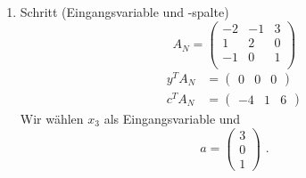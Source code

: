 \documentclass[a4paper]{scrartcl}
\begin{document}
\begin{enumerate}[label=\bfseries\arabic*.]
\begin{enumerate}
\begin{enumerate}[1.]
\begin{enumerate}[1.]
                            \item Schritt (Eingangsvariable und -spalte)
                                \begin{equation}
                                    A_N =
                                    \begin{pmatrix}
                                        -2 & -1 &  3 \\
                                         1 &  2 &  0 \\
                                        -1 &  0 &  1 \\
                                    \end{pmatrix}
                                \end{equation}
                                \begin{align}
                                    y^TA_N &=
                                    \begin{pmatrix}
                                        0 & 0 & 0
                                    \end{pmatrix} \\
                                    c^TA_N &=
                                    \begin{pmatrix}
                                        -4 & 1 & 6
                                    \end{pmatrix}
                                \end{align}
                                Wir wählen $x_3$ als Eingangsvariable und
                                \begin{equation}
                                    a =
                                    \begin{pmatrix}
                                        3 \\ 0 \\ 1
                                    \end{pmatrix}
                                    \text{ .}   
                                \end{equation}


\end{enumerate}
\end{enumerate}
\end{enumerate}
\end{enumerate}
\end{document}
